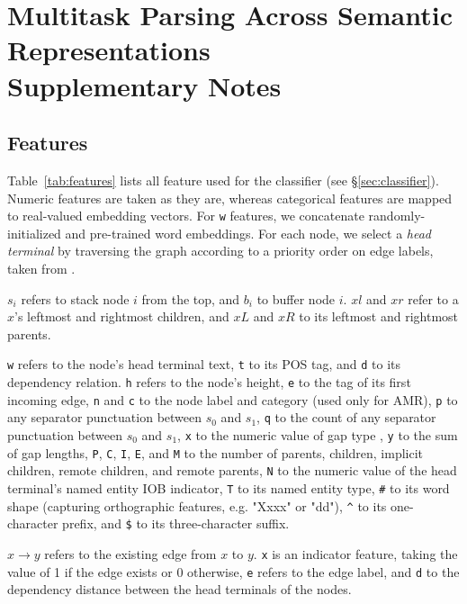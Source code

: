 %
%
\chapter{Multitask Parsing Across Semantic Representations \\ Supplementary Notes}

\section{Features}

Table~\ref{tab:features} lists all feature used for the classifier (see \S\ref{sec:classifier}).
Numeric features are taken as they are, whereas categorical features are mapped to real-valued embedding
vectors.
For \texttt{w} features,
we concatenate randomly-initialized and pre-trained word embeddings.
For each node, we select a \textit{head terminal} by traversing the graph according to
a priority order on edge labels, taken from \citet{hershcovich2017a}.

$s_i$ refers to stack node $i$ from the top, and
$b_i$ to buffer node $i$.
$xl$ and $xr$ refer to a $x$'s leftmost and rightmost children, and
$xL$ and $xR$ to its leftmost and rightmost parents.

\texttt{w} refers to the node's head terminal text,
\texttt{t} to its POS tag, and
\texttt{d} to its dependency relation.
\texttt{h} refers to the node's height,
\texttt{e} to the tag of its first incoming edge,
\texttt{n} and \texttt{c} to the node label and category (used only for AMR),
\texttt{p} to any separator punctuation between $s_0$ and $s_1$,
\texttt{q} to the count of any separator punctuation between $s_0$ and $s_1$,
\texttt{x} to the numeric value of gap type \cite{maier-lichte:2016:DiscoNLP},
\texttt{y} to the sum of gap lengths,
\texttt{P}, \texttt{C}, \texttt{I}, \texttt{E}, and \texttt{M} to the number of
parents, children, implicit children, remote children, and remote parents,
\texttt{N} to the numeric value of the head terminal's named entity IOB indicator,
\texttt{T} to its named entity type,
\texttt{\#} to its word shape (capturing orthographic features, e.g. "Xxxx" or "dd"),
\texttt{\^{}} to its one-character prefix, and
\texttt{\$} to its three-character suffix.

$x \to y$ refers to the existing edge from $x$ to $y$.
\texttt{x} is an indicator feature, taking the value of 1 if the edge exists or 0 otherwise,
\texttt{e} refers to the edge label, and
\texttt{d} to the dependency distance between the head terminals of the nodes.

